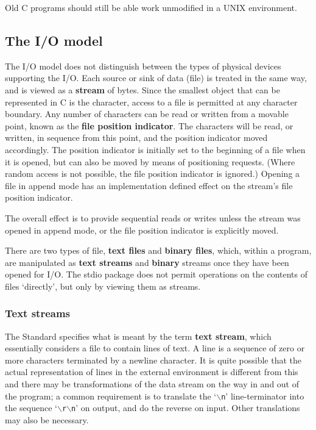    Old C programs should still be able work unmodified in a
    UNIX environment.


  

  \subsection{The I/O model}
   

   The I/O model does not distinguish between the types of physical devices
    supporting the I/O.  Each source or sink of data (file) is treated in the
    same way, and is viewed as a \textbf{stream} of bytes.  Since the
    smallest object that can be represented in C is the character, access to
    a file is permitted at any character boundary. Any number of characters can
    be read or written from a movable point, known as the \textbf{file position
    indicator}.  The characters will be read, or written, in sequence from
    this point, and the position indicator moved accordingly.  The position
    indicator is initially set to the beginning of a file when it is opened,
    but can also be moved by means of positioning requests.  (Where random
    access is not possible, the file position indicator is ignored.) Opening
    a file in append mode has an implementation defined effect on the stream's
    file position indicator.


   The overall effect is to provide sequential reads or writes unless the
    stream was opened in append mode, or the file position indicator is
    explicitly moved.


   There are two types of file, \textbf{text files} and \textbf{binary
    files}, which, within a program, are manipulated as \textbf{text
    streams} and \textbf{binary} streams once they have been opened for
    I/O.  The stdio package does not permit operations on the contents of files
    `directly', but only by viewing them as streams.


   \subsubsection{Text streams}
    

    The Standard specifies what is meant by the term \textbf{text stream},
     which essentially considers a file to contain lines of text.  A line is
     a sequence of zero or more characters terminated by a newline character.
     It is quite possible that the actual representation of lines in the
     external environment is different from this and there may be
     transformations of the data stream on the way in and out of the program;
     a common requirement is to translate the `\texttt{$\backslash$n}'
     line-terminator into the sequence `\texttt{$\backslash$r$\backslash$n}' on output, and
     do the reverse on input.  Other translations may also be necessary.



